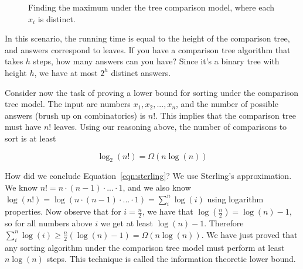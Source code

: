 \begin{figure}[hpt]
\centering
\caption{Finding the maximum under the tree comparison model, where
each $x_i$ is distinct.}
\label{fig:tree-comparison-model}
\end{figure}

In this scenario, the running time is equal to the height of the 
comparison tree, and answers correspond to leaves. If you have
a comparison tree algorithm that takes $h$ steps, how many answers
can you have? Since it's a binary tree with height $h$, we have
at most $2^h$ distinct answers.

Consider now the task of proving a lower bound for sorting under
the comparison tree model. The input are numbers $x_1, x_2, ..., x_n$,
and the number of possible answers (brush up on combinatorics) is
$n!$. This implies that the comparison tree must have $n!$ leaves.
Using our reasoning above, the number of comparisons to sort
is at least

\begin{equation}\label{eqn:sterling}
    \log_2(n!) = \Omega(n\log(n))
\end{equation}

How did we conclude Equation~\ref{eqn:sterling}? We use Sterling's
approximation. We know $n! = n \cdot (n-1) \cdot ... \cdot 1$, and
we also know $\log(n!) = \log(n \cdot (n-1) \cdot ... \cdot 1) =
\sum_i^n\log(i)$ using logarithm properties. Now observe that
for $i = \frac{n}{2}$, we have that $\log(\frac{n}{2}) = \log(n) - 1$,
so for all numbers above $i$ we get at least $\log(n) - 1$.
Therefore $\sum_i^n\log(i) \geq \frac{n}{2}(\log(n) - 1) = \Omega(n\log(n))$. We have just proved that any sorting algorithm under the comparison tree model must perform at least $n\log(n)$ steps. This technique is called the information theoretic lower bound.

